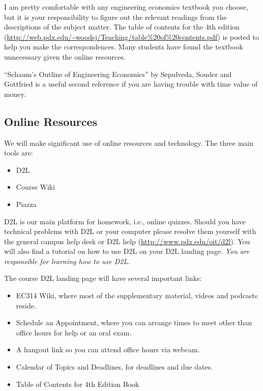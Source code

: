 \documentclass[letterpaper,10pt]{article}
\newif\ifonline
\begin{document}
I am pretty comfortable with any engineering
economics textbook you choose, but it is your responsibility to figure
out the relevant readings from the descriptions of the subject matter.
The table of contents for the 4th edition (\url{http://web.pdx.edu/~woodsj/Teaching/table\%20of\%20contents.pdf}) is posted to help you
make the correspondences.  Many students have found the textbook unnecessary given the online resources.

``Schaum's Outline of Engineering Economics'' by Sepulveda, Souder and Gottfried is a useful second reference if you are having trouble with time value of money.

\subsection{Online Resources}
We will make significant use of online resources and technology.  The
three main tools are:
\begin{itemize}
\item D2L
\item Course Wiki
\item Piazza
\end{itemize}

D2L is our main platform for homework, i.e., online quizzes.  Should you have technical problems with D2L
or your computer please resolve them yourself with the general campus
help desk or D2L help (\url{http://www.pdx.edu/oit/d2l}).  You will
also find a tutorial on how to use D2L on your D2L landing page.
\emph{You are responsible for learning how to use D2L.}


The course D2L landing page will have several important links:
\begin{itemize}
  \item EC314 Wiki, where most of the supplementary material, videos and
    podcasts reside.
  \ifonline
    \item Schedule an Appointment, where you can arrange times to meet
    other than office hours for help.
    \else
    \item Schedule an Appointment, where you can arrange times to meet
    other than office hours for help or an oral exam.  
  \fi
  
  \item A hangout link so you can attend office hours via webcam.
  \item Calendar of Topics and Deadlines, for deadlines and due dates.
  \item Table of Contents for 4th Edition Book
\end{itemize}
\end{document}
